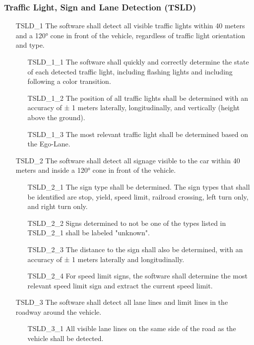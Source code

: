 \subsubsection{Traffic Light, Sign and Lane Detection (TSLD)}
\begin{itemize}
    \item[TSLD\_1] The software shall detect all visible traffic lights within 40 meters and a 120° cone in front of the vehicle, regardless of traffic light orientation and type.
    \begin{itemize}
        \item[TSLD\_1\_1] The software shall quickly and correctly determine the state of each detected traffic light, including flashing lights and including following a color transition.
        \item[TSLD\_1\_2] The position of all traffic lights shall be determined with an accuracy of ± 1 meters laterally, longitudinally, and vertically (height above the ground).
        \item[TSLD\_1\_3] The most relevant traffic light shall be determined based on the Ego-Lane.
    \end{itemize}
    \item[TSLD\_2] The software shall detect all signage visible to the car within 40 meters and inside a 120° cone in front of the vehicle. 
    \begin{itemize}
        \item[TSLD\_2\_1] The sign type shall be determined. The sign types that shall be identified are stop, yield, speed limit, railroad crossing, left turn only, and right turn only.
        \item[TSLD\_2\_2] Signs determined to not be one of the types listed in TSLD\_2\_1 shall be labeled "unknown".
        \item[TSLD\_2\_3] The distance to the sign shall also be determined, with an accuracy of ± 1 meters laterally and longitudinally.
        \item[TSLD\_2\_4] For speed limit signs, the software shall determine the most relevant speed limit sign and extract the current speed limit.
    \end{itemize}
    \item[TSLD\_3] The software shall detect all lane lines and limit lines in the roadway around the vehicle.
    \begin{itemize}
        \item[TSLD\_3\_1] All visible lane lines on the same side of the road as the vehicle shall be detected.

\end{itemize}
\end{itemize}
